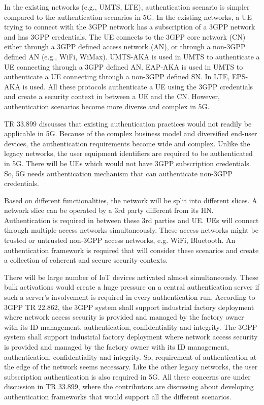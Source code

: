 \documentclass[12pt]{llncs}
\begin{document}
In the existing networks (e.g., UMTS, LTE), authentication scenario is simpler compared to the authentication scenarios in 5G. In the existing networks, a UE trying to connect with the 3GPP network has a subscription of a 3GPP network and has 3GPP credentials. The UE connects to the 3GPP core network (CN) either through a 3GPP defined access network (AN), or through a non-3GPP defined AN (e.g., WiFi, WiMax). UMTS-AKA is used in UMTS to authenticate a UE connecting through a 3GPP defined AN. EAP-AKA is used in UMTS to authenticate a UE connecting through a non-3GPP defined SN. In LTE, EPS-AKA is used. All these protocols authenticate a UE using the 3GPP credentials and create a security context in between a UE and the CN. However, authentication scenarios become more diverse and complex in 5G.

TR 33.899 discusses that existing authentication practices would not readily be applicable in 5G. Because of the complex business model and diversified end-user devices, the authentication requirements become wide and complex. Unlike the legacy networks, the user equipment identifiers are required to be authenticated in 5G. There will be UEs which would not have 3GPP subscription credentials. So, 5G needs authentication mechanism that can authenticate non-3GPP credentials. 

Based on different functionalities, the network will be split into different slices. A network slice can be operated by a 3rd party different from its HN. Authentication is required in between these 3rd parties and UE. UEs will connect through multiple access networks simultaneously. These access networks might be trusted or untrusted non-3GPP access networks, e.g. WiFi, Bluetooth. An authentication framework is required that will consider these scenarios and create a collection of coherent and secure security-contexts.

There will be large number of IoT devices activated almost simultaneously. These bulk activations would create a huge pressure on a central authentication server if such a server's involvement is required in every authentication run. According to 3GPP TR 22.862, the 3GPP system shall support industrial factory deployment where network access security is provided and managed by the factory owner with its ID management, authentication, confidentiality and integrity. The 3GPP system shall support industrial factory deployment where network access security is provided and managed
by the factory owner with its ID management, authentication, confidentiality and integrity. So, requirement of authentication at the edge of the network seems necessary. Like the other legacy networks, the user subscription authentication is also required in 5G. All these concerns are under discussion in TR 33.899, where the contributors are discussing about developing authentication frameworks that would support all the different scenarios. 
\end{document}
